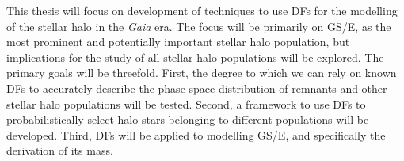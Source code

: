 This thesis will focus on development of techniques to use DFs for the modelling of the stellar halo in the \textit{Gaia} era. The focus will be primarily on GS/E, as the most prominent and potentially important stellar halo population, but implications for the study of all stellar halo populations will be explored. The primary goals will be threefold. First, the degree to which we can rely on known DFs to accurately describe the phase space distribution of remnants and other stellar halo populations will be tested. Second, a framework to use DFs to probabilistically select halo stars belonging to different populations will be developed. Third, DFs will be applied to modelling GS/E, and specifically the derivation of its mass.